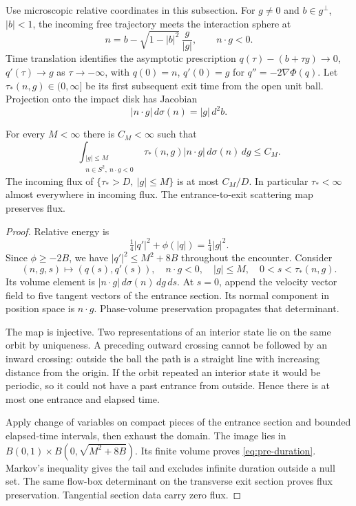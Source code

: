 Use microscopic relative coordinates in this subsection.
For $g\ne0$ and $b\in g^\perp$, $|b|<1$, the incoming free trajectory
meets the interaction sphere at
\[
 n=b-\sqrt{1-|b|^2}\,\frac g{|g|},\qquad n\cdot g<0.
\]
Time translation identifies the asymptotic prescription
$q(\tau)-(b+\tau g)\to0$, $q'(\tau)\to g$ as $\tau\to-\infty$,
with $q(0)=n$, $q'(0)=g$ for $q''=-2\nabla\Phi(q)$.
Let $\tau_*(n,g)\in(0,\infty]$ be its first subsequent exit time from
the open unit ball.
Projection onto the impact disk has Jacobian
\begin{equation}\label{eq:pre-fluxdisk}
 |n\cdot g|\,d\sigma(n)=|g|\,d^2b.
\end{equation}

\begin{lemma}\label{pre:duration}
For every $M<\infty$ there is $C_M<\infty$ such that
\begin{equation}\label{eq:pre-duration}
 \int_{\substack{|g|\leq M\\n\in S^2,\ n\cdot g<0}}
 \tau_*(n,g)|n\cdot g|\,d\sigma(n)\,dg\leq C_M.
\end{equation}
The incoming flux of $\{\tau_*>D,\ |g|\leq M\}$ is at most $C_M/D$.
In particular $\tau_*<\infty$ almost everywhere in incoming flux.
The entrance-to-exit scattering map preserves flux.
\end{lemma}

\begin{proof}
Relative energy is
\[
 \tfrac14|q'|^2+\phi(|q|)=\tfrac14|g|^2.
\]
Since $\phi\geq-2B$, we have $|q'|^2\leq M^2+8B$ throughout the
encounter. Consider
\[
 (n,g,s)\longmapsto(q(s),q'(s)),
 \quad n\cdot g<0,\quad |g|\leq M,\quad0<s<\tau_*(n,g).
\]
Its volume element is $|n\cdot g|\,d\sigma(n)\,dg\,ds$.
At $s=0$, append the velocity vector field to five tangent vectors of
the entrance section. Its normal component in position space is
$n\cdot g$. Phase-volume preservation propagates that determinant.

The map is injective. Two representations of an interior state lie on
the same orbit by uniqueness. A preceding outward crossing cannot be
followed by an inward crossing: outside the ball the path is a
straight line with increasing distance from the origin. If the orbit
repeated an interior state it would be periodic, so it could not have
a past entrance from outside. Hence there is at most one entrance and
elapsed time.

Apply change of variables on compact pieces of the entrance section
and bounded elapsed-time intervals, then exhaust the domain.
The image lies in $B(0,1)\times B(0,\sqrt{M^2+8B})$.
Its finite volume proves \eqref{eq:pre-duration}.
Markov's inequality gives the tail and excludes infinite duration
outside a null set. The same flow-box determinant on the transverse
exit section proves flux preservation. Tangential section data carry
zero flux.
\end{proof}

